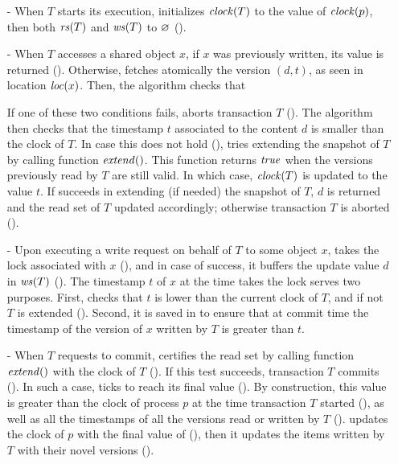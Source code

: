\begin{itemize}
\item[-] %
  When $T$ starts its execution,  initializes $\clockOf{T}$ to the value of $\clockOf{p}$, then both $\readSetOf{T}$ and $\writeSetOf{T}$ to $\emptySet$ ().
\item[-] %
  When $T$ accesses a shared object $x$, if $x$ was previously written, its value is returned ().
  Otherwise,  fetches atomically the version $(d,t)$, as seen in location $\locationOf{x}$.
  Then, the algorithm checks that 
  If one of these two conditions fails,  aborts transaction $T$ ().
  The algorithm then checks that the timestamp $t$ associated to the content $d$ is smaller than the clock of $T$.
  In case this does not hold (),  tries extending the snapshot of $T$ by calling function $\stmExtend{}$.
  This function returns $\true$ when the versions previously read by $T$ are still valid.
  In which case, $\clockOf{T}$ is updated to the value $t$.
  If  succeeds in extending (if needed) the snapshot of $T$, $d$ is returned and the read set of $T$ updated accordingly;
  otherwise transaction $T$ is aborted ().
\item[-] %
  Upon executing a write request on behalf of $T$ to some object $x$,  takes the lock associated with $x$ (), and in case of success, it buffers the update value $d$ in $\writeSetOf{T}$ ().
  The timestamp $t$ of $x$ at the time  takes the lock serves two purposes.
  First,  checks that $t$ is lower than the current clock of $T$, and if not $T$ is extended ().
  Second, it is saved in  to ensure that at commit time the timestamp of the version of $x$ written by $T$ is greater than $t$.
\item[-] %
  When $T$ requests to commit,  certifies the read set by calling function $\stmExtend{}$ with the clock of $T$ ().
  If this test succeeds, transaction $T$ commits ().
  In such a case,  ticks to reach its final value ().
  By construction, this value is greater than the clock of process $p$ at the time transaction $T$ started (), as well as all the timestamps of all the versions read or written by $T$ ().
   updates the clock of $p$ with the final value of  (), then it updates the items written by $T$ with their novel versions ().
\end{itemize}

